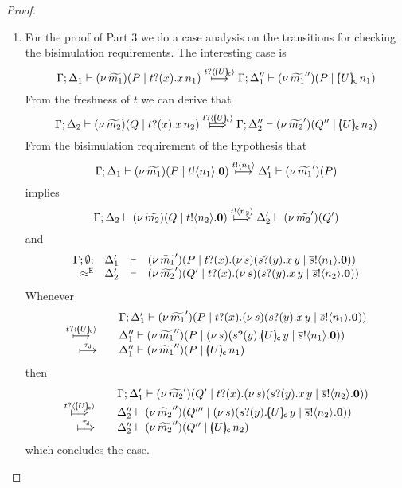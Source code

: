 \begin{proof}
\begin{enumerate}
		\item	For the proof of Part 3 we do a case analysis on the transitions for checking the bisimulation requirements. The interesting case is
				\[
					\Gamma; \Delta_1 \proves \newsp{\widetilde{m_1}}{P \Par \binp{t}{x} \appl{x}{n_1}}
					\hby{\bactinp{t}{\omapchar{U}}} 
					\Gamma; \Delta_1'' \proves \newsp{\widetilde{m_1}''}{P \Par \appl{\omapchar{U}}{n_1}}
				\]
				From the freshness of $t$ we can derive that
				\[
					\Gamma; \Delta_2 \proves \newsp{\widetilde{m_2}}{Q \Par \binp{t}{x} \appl{x}{n_2}}
					\Hby{\bactinp{t}{\omapchar{U}}} 
					\Gamma; \Delta_2'' \proves \newsp{\widetilde{m_2}'}{Q'' \Par \appl{\omapchar{U}}{n_2}}
				\]
				From the bisimulation requirement of the hypothesis that
				\[
					\Gamma; \Delta_1 \vdash  (\nu\, \widetilde{m_1})(P \;|\; t ! \langle n_1 \rangle . \mathbf{0})  \stackrel{t ! \langle n_1 \rangle }{\longmapsto} \Delta_1' \vdash  (\nu\, \widetilde{m_1}')(P)
				\]
				implies
				\[
					\horel{\Gamma}{\Delta_2}{ \newsp{\widetilde{m_2}}{Q \Par \bout{t}{n_2} \inact} }
					{\Hby{\bactout{t}{n_2} }}
					{\Delta_2'}{ \newsp{\widetilde{m_2}'}{Q'} }
				\]
				and
				\[
					\begin{array}{rcll} \Gamma; \emptyset; &\Delta_1'& \vdash&  (\nu\, \widetilde{m_1}')(P \;|\; t ? (x) . (\nu\, s)( s ? (y) . x\, {y} \;|\; \overline{s} ! \langle n_1 \rangle . \mathbf{0} ) ) \\ \approx^\mathtt{H} &\Delta_2'& \vdash &   (\nu\, \widetilde{m_2}')(Q' \;|\; t ? (x) . (\nu\, s)( s ? (y) . x\, {y} \;|\; \overline{s} ! \langle n_2 \rangle . \mathbf{0} ))  \end{array}
				\]
				Whenever
				\[
				\begin{array}{rcl}
					&& \Gamma; \Delta_1' \proves \newsp{\widetilde{m_1}'}{P \Par \binp{t}{x} \newsp{s}{ \binp{s}{y} \appl{x}{y} \Par \bout{\dual{s}}{n_1} \inact}}\\ 
					\hby{\bactinp{t}{\omapchar{U}}}&& 
					\Delta_1'' \proves \newsp{\widetilde{m_1}''}{P \Par \newsp{s}{ \binp{s}{y} \appl{\omapchar{U}}{y} \Par \bout{\dual{s}}{n_1} \inact }}
					\\
					\hby{\dtau} &&
					\Delta_1'' \proves \newsp{\widetilde{m_1}''}{P \Par \appl{\omapchar{U}}{n_1}}
				\end{array}
				\]
				then
				\[
				\begin{array}{rcl}
					&&\Gamma; \Delta_1' \proves \newsp{\widetilde{m_2}'}{Q' \Par \binp{t}{x} \newsp{s}{ \binp{s}{y} \appl{x}{y} \Par \bout{\dual{s}}{n_2} \inact } }
					\\
					\Hby{\bactinp{t}{\omapchar{U}}} &&
					\Delta_2'' \proves \newsp{\widetilde{m_2}''}{Q''' \Par \newsp{s}{ \binp{s}{y} \appl{\omapchar{U}}{y} \Par \bout{\dual{s}}{n_2} \inact }}
					\\
					\Hby{\dtau} &&
					\Delta_2'' \proves \newsp{\widetilde{m_2}''}{Q'' \Par \appl{\omapchar{U}}{n_2}}
				\end{array}
				\]
				which concludes the case.
				

\end{enumerate}
\end{proof}
